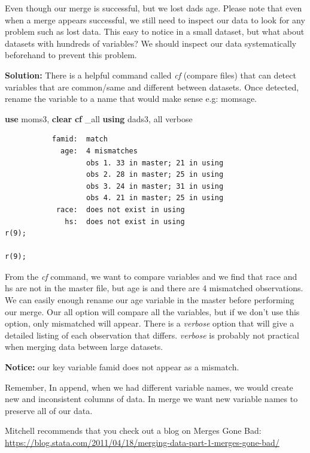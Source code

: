 \documentclass[
]{book}
\newenvironment{Shaded}{\begin{snugshade}}{\end{snugshade}}
\newcommand{\DataTypeTok}[1]{\textcolor[rgb]{0.13,0.29,0.53}{#1}}
\newcommand{\KeywordTok}[1]{\textcolor[rgb]{0.13,0.29,0.53}{\textbf{#1}}}
\newcommand{\NormalTok}[1]{#1}
\newcommand{\OtherTok}[1]{\textcolor[rgb]{0.56,0.35,0.01}{#1}}
\begin{document}
Even though our merge is successful, but we lost dads age. Please note that even when a merge appears successful, we still need to inspect our data to look for any problem such as lost data. This easy to notice in a small dataset, but what about datasets with hundreds of variables? We should inspect our data systematically beforehand to prevent this problem.

\textbf{Solution:}
There is a helpful command called \emph{cf} (compare files) that can detect variables that are common/same and different between datasets. Once detected, rename the variable to a name that would make sense e.g: momsage.

\begin{Shaded}
\begin{Highlighting}[]
\KeywordTok{use}\NormalTok{ moms3, }\KeywordTok{clear}
\KeywordTok{cf} \DataTypeTok{\_all} \KeywordTok{using}\NormalTok{ dads3, }\OtherTok{all}\NormalTok{ verbose}
\end{Highlighting}
\end{Shaded}

\begin{verbatim}
           famid:  match
             age:  4 mismatches
                   obs 1. 33 in master; 21 in using
                   obs 2. 28 in master; 25 in using
                   obs 3. 24 in master; 31 in using
                   obs 4. 21 in master; 25 in using
            race:  does not exist in using
              hs:  does not exist in using
r(9);

r(9);
\end{verbatim}

From the \emph{cf} command, we want to compare variables and we find that race and hs are not in the master file, but age is and there are 4 mismatched observations. We can easily enough rename our age variable in the master before performing our merge. Our all option will compare all the variables, but if we don't use this option, only mismatched will appear. There is a \emph{verbose} option that will give a detailed listing of each observation that differs. \emph{verbose} is probably not practical when merging data between large datasets.

\textbf{Notice:} our key variable famid does not appear as a mismatch.

Remember, In append, when we had different variable names, we would create new and inconsistent columns of data. In merge we want new variable names to preserve all of our data.

Mitchell recommends that you check out a blog on Merges Gone Bad:
\url{https://blog.stata.com/2011/04/18/merging-data-part-1-merges-gone-bad/}
\end{document}
